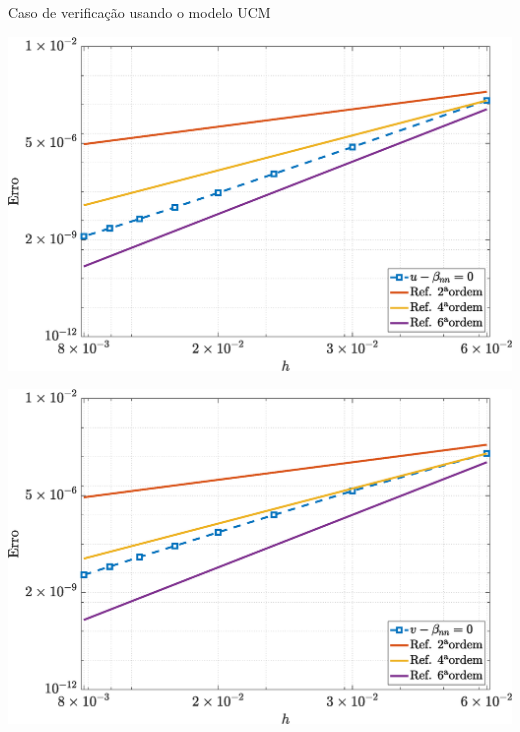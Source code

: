 \begin{frame}{Caso de verificação usando o modelo UCM}
    \centering
    \captionsetup{justification=centering}
    \label{fig:ucm_1}
    \begin{minipage}{0.49\textwidth}
        \centering
        \includegraphics[width=\textwidth]{Figures/UCM/NormErr_2nd_Re_100_Wi_1_epsilon_0_xi_0_alphaG_0_Dt_1e-06_at_0.05_tipsim_1_MMS_12_U.eps}
        \label{ucm_u_Case11}
    \end{minipage}
    \hfill
    \begin{minipage}{0.49\textwidth}
        \centering
        \includegraphics[width=\textwidth]{Figures/UCM/NormErr_2nd_Re_100_Wi_1_epsilon_0_xi_0_alphaG_0_Dt_1e-06_at_0.05_tipsim_1_MMS_12_V.eps}
        \label{ucm_v_Case11}
    \end{minipage}
\end{frame}


